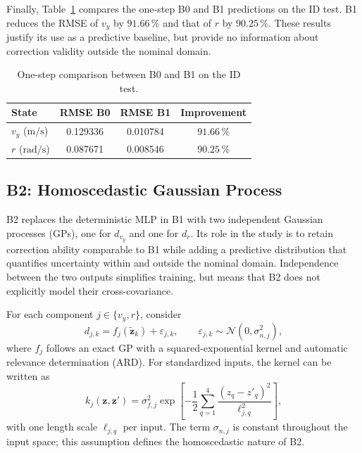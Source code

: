 \documentclass[12pt,a4paper]{report}
\begin{document}
Finally, Table~\ref{tab:b1_physics_hybrid_comparison} compares the one-step B0 and B1 predictions on the ID test. B1 reduces the RMSE of $v_y$ by $91.66$\,\% and that of $r$ by $90.25$\,\%. These results justify its use as a predictive baseline, but provide no information about correction validity outside the nominal domain.

\begin{table}[htbp]
    \centering
    \caption{One-step comparison between B0 and B1 on the ID test.}
    \label{tab:b1_physics_hybrid_comparison}
    \begin{tabular}{@{}lccc@{}}
        \toprule
        State & RMSE B0 & RMSE B1 & Improvement \\
        \midrule
        $v_y$ ($\mathrm{m/s}$)   & 0.129336 & 0.010784 & $91.66$\,\% \\
        $r$ ($\mathrm{rad/s}$)   & 0.087671 & 0.008546 & $90.25$\,\% \\
        \bottomrule
    \end{tabular}
\end{table}

\subsection{B2: Homoscedastic Gaussian Process}
\label{sec:modelo_b2}

B2 replaces the deterministic MLP in B1 with two independent Gaussian processes (GPs), one for $d_{v_y}$ and one for $d_r$. Its role in the study is to retain correction ability comparable to B1 while adding a predictive distribution that quantifies uncertainty within and outside the nominal domain. Independence between the two outputs simplifies training, but means that B2 does not explicitly model their cross-covariance.

For each component $j\in\{v_y,r\}$, consider
\begin{equation}
    d_{j,k}
    =
    f_j(\tilde{\mathbf{z}}_k)
    +
    \varepsilon_{j,k},
    \qquad
    \varepsilon_{j,k}\sim
    \mathcal{N}(0,\sigma_{n,j}^2),
    \label{eq:b2_gp_observation_model}
\end{equation}
where $f_j$ follows an exact GP with a squared-exponential kernel and automatic relevance determination (ARD). For standardized inputs, the kernel can be written as
\begin{equation}
    k_j(\mathbf{z},\mathbf{z}')
    =
    \sigma_{f,j}^2
    \exp\!\left[
        -\frac{1}{2}
        \sum_{q=1}^{4}
        \frac{(z_q-z'_q)^2}{\ell_{j,q}^2}
    \right],
    \label{eq:b2_ard_kernel}
\end{equation}
with one length scale $\ell_{j,q}$ per input. The term $\sigma_{n,j}$ is constant throughout the input space; this assumption defines the homoscedastic nature of B2.
\end{document}
